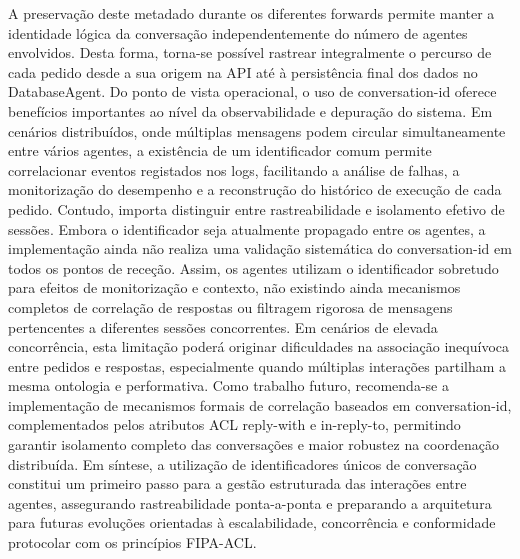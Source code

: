 \documentclass[runningheads]{llncs}
\begin{document}
A preservação deste metadado durante os diferentes forwards permite manter a identidade lógica da conversação independentemente do número de agentes envolvidos. Desta forma, torna-se possível rastrear integralmente o percurso de cada pedido desde a sua origem na API até à persistência final dos dados no DatabaseAgent. 
Do ponto de vista operacional, o uso de conversation-id oferece benefícios importantes ao nível da observabilidade e depuração do sistema. Em cenários distribuídos, onde múltiplas mensagens podem circular simultaneamente entre vários agentes, a existência de um identificador comum permite correlacionar eventos registados nos logs, facilitando a análise de falhas, a monitorização do desempenho e a reconstrução do histórico de execução de cada pedido. 
Contudo, importa distinguir entre rastreabilidade e isolamento efetivo de sessões. Embora o identificador seja atualmente propagado entre os agentes, a implementação ainda não realiza uma validação sistemática do conversation-id em todos os pontos de receção. Assim, os agentes utilizam o identificador sobretudo para efeitos de monitorização e contexto, não existindo ainda mecanismos completos de correlação de respostas ou filtragem rigorosa de mensagens pertencentes a diferentes sessões concorrentes. 
Em cenários de elevada concorrência, esta limitação poderá originar dificuldades na associação inequívoca entre pedidos e respostas, especialmente quando múltiplas interações partilham a mesma ontologia e performativa. Como trabalho futuro, recomenda-se a implementação de mecanismos formais de correlação baseados em conversation-id, complementados pelos atributos ACL reply-with e in-reply-to, permitindo garantir isolamento completo das conversações e maior robustez na coordenação distribuída. 
Em síntese, a utilização de identificadores únicos de conversação constitui um primeiro passo para a gestão estruturada das interações entre agentes, assegurando rastreabilidade ponta-a-ponta e preparando a arquitetura para futuras evoluções orientadas à escalabilidade, concorrência e conformidade protocolar com os princípios FIPA-ACL. 
\end{document}
